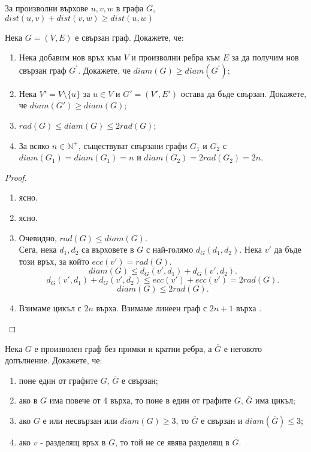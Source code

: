 \begin{problem}
  За произволни върхове $u,v,w$ в графа $G$, 
  $dist(u,v)+dist(v,w) \geq dist(u,w)$
\end{problem}


\begin{problem}
  Нека $G = (V,E)$ е свързан граф. Докажете, че:
  \begin{enumerate}
  \item
    Нека добавим нов връх към $V$ и произволни ребра към $E$ за да получим нов свързан граф $G^\prime$.
    Докажете, че $diam(G)\geq diam(G^\prime)$;
  \item
    Нека $V' = V\setminus{\{u\}}$ за $u\in V$ и $G' = (V',E')$ остава да бъде свързан.
    Докажете, че $diam(G')\geq diam(G)$;
  \item
    $rad(G)\leq diam(G)\leq 2rad(G)$;
  \item
    За всяко $n\in \mathbb{N}^+$, съществуват свързани графи $G_1$ и $G_2$ с
    $diam(G_1)=diam(G_1)=n$ и $diam(G_2) = 2rad(G_2) = 2n$.
\end{enumerate}
\end{problem}
\begin{proof}
  \begin{enumerate}
  \item
    ясно.
  \item
    ясно.
  \item
    Очевидно, $rad(G)\leq diam(G)$.\\
    Сега, нека $d_1,d_2$ са върховете в $G$ с най-голямо $d_G(d_1,d_2)$.
    Нека $v'$ да бъде този връх, за който $ecc(v') = rad(G)$.
    \[diam(G)\leq d_G(v',d_1) + d_G(v',d_2).\]
    \[d_G(v',d_1) + d_G(v',d_2) \leq ecc(v') + ecc(v') = 2rad(G).\]
    \[diam(G)\leq 2rad(G).\]
  \item
    Взимаме цикъл с $2n$ върха.
    Взимаме линеен граф с $2n+1$ върха .
\end{enumerate}

\end{proof} 


\begin{problem} %
  Нека $G$ е произволен граф без примки и кратни ребра, а $\overline{G}$ е неговото допълнение. Докажете, че:
  \begin{enumerate}
  \item
    поне един от графите $G$, $\overline{G}$ е свързан;
  \item
    ако в $G$ има повече от 4 върха, то поне в един от графите $G$, $\overline{G}$ има цикъл;
  \item
    ако $G$ е или несвързан или $diam(G)\geq 3$, то $\overline{G}$ е свързан и $diam(\overline{G})\leq 3$;
  \item
    ако $v$ - разделящ връх в $G$, то той не се явява разделящ в $\overline{G}$.
\end{enumerate}
\end{problem}

